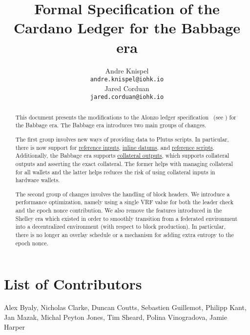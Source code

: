 

\cleardoublepage
\renewcommand{\thepage}{\arabic{page}}
\setcounter{page}{1}

\title{Formal Specification of the Cardano Ledger for the Babbage era}

\author{
   Andre Knispel \\ {\small \texttt{andre.knispel@iohk.io}} \\
   Jared Corduan \\ {\small \texttt{jared.corduan@iohk.io}} \\
   }

\date{}

\maketitle

\begin{abstract}
This document presents the modifications to the Alonzo ledger specification~
(see \cite{alonzo_spec}) for the Babbage era.
The Babbage era introduces two main groups of changes.

The first group involves new ways of providing data to Plutus scripts.
In particular, there is now support for
\href{https://cips.cardano.org/cips/cip31/}{reference inputs},
\href{https://cips.cardano.org/cips/cip32/}{inline datums}, and
\href{https://cips.cardano.org/cips/cip33/}{reference scripts}.
Additionally, the Babbage era supports
\href{https://github.com/cardano-foundation/CIPs/pull/216}{collateral outputs},
which supports collateral outputs and asserting the exact collateral.
The former helps with managing collateral for all wallets and the latter helps
reduces the risk of using collateral inputs in hardware wallets.

The second group of changes involves the handling of block headers.
We introduce a performance optimization, namely using a single VRF value for both
the leader check and the epoch nonce contribution.
We also remove the features introduced in the Shelley era which existed in order
to smoothly transition from a federated environment into a decentralized environment
(with respect to block production).
In particular, there is no longer an overlay schedule or a mechanism for adding
extra entropy to the epoch nonce.
\end{abstract}

\section*{List of Contributors}
\label{acknowledgements}

Alex Byaly,
Nicholas Clarke,
Duncan Coutts,
Sebastien Guillemot,
Philipp Kant,
Jan Mazak,
Michal Peyton Jones,
Tim Sheard,
Polina Vinogradova,
Jamie Harper
